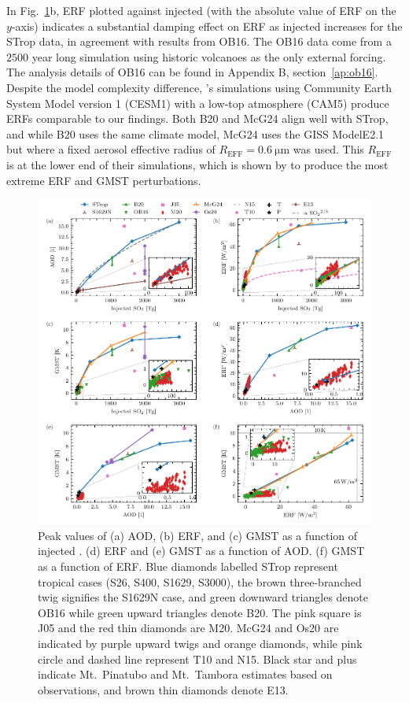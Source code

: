 \documentclass[draft]{agujournal2019}
\begin{document}
  In Fig.~\ref{fig:4_parameter_scan}b, ERF plotted against injected  (with the
  absolute value of ERF on the \(y\)-axis) indicates a substantial damping effect on ERF
  as injected  increases for the STrop data, in agreement with results from
  OB16. The OB16 data come from a \(2500\) year long simulation using historic volcanoes
  as the only external forcing. The analysis details of OB16 can be found in Appendix B,
  section~\ref{ap:ob16}. Despite the model complexity difference,
  's simulations using Community Earth System Model version 1
  (CESM1) with a low-top atmosphere (CAM5) produce ERFs comparable to our findings. Both
  B20 and McG24 align well with STrop, and while B20 uses the same climate model, McG24
  uses the GISS ModelE2.1 but where a fixed aerosol effective radius of
  \(R_{\text{EFF}}=\SI{0.6}{\micro\meter}\) was used. This \(R_{\text{EFF}}\) is at the
  lower end of their simulations, which is shown by  to produce the
  most extreme ERF and GMST perturbations.

  \begin{figure}
    \centering \includegraphics[width=\textwidth]{figure4}

    \caption{Peak values of (a) AOD, (b) ERF, and (c) GMST as a
      function of injected \@. (d) ERF and (e) GMST as a function of AOD. (f)
      GMST as a function of ERF. Blue diamonds labelled STrop represent tropical cases
      (S26, S400, S1629, S3000), the brown three-branched twig signifies the S1629N
      case, and green downward triangles denote OB16 while green upward triangles denote
      B20. The pink square is J05 and the red thin diamonds are M20. McG24 and Os20 are
      indicated by purple upward twigs and orange diamonds, while pink circle and dashed
      line represent T10 and N15. Black star and plus indicate Mt.\ Pinatubo and
      Mt.\ Tambora estimates based on observations, and brown thin diamonds denote E13.
    }\label{fig:4_parameter_scan}%
  \end{figure}
\end{document}
